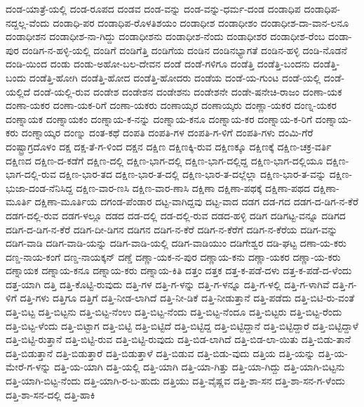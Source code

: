 ದಂಡ-ಯಾತ್ರೆ-ಯಲ್ಲಿ
ದಂಡ-ರೂಪದ
ದಂಡವ
ದಂಡ-ವನ್ನು
ದಂಡ-ವನ್ನು-ಧರ್ಮ-ದಂಡ
ದಂಡಾಧಿಪ
ದಂಡಾಧಿಪ-ನದ್ದಲ್ಲ-ವೆಂದು
ದಂಡಾಧಿ-ಪರ
ದಂಡಾಧಿಪ-ರೊಳತಿಶಯಂ
ದಂಡಾಧೀಶ
ದಂಡಾಧೀಶಂ
ದಂಡಾಧೀಶ-ದಾ-ವಾನ-ಲನೂ
ದಂಡಾಧೀಶನ
ದಂಡಾಧೀಶ-ನಾ-ಗಿದ್ದು
ದಂಡಾಧೀಶನು
ದಂಡಾಧೀಶ-ನೆಂದು
ದಂಡಾಧೀಶರ
ದಂಡಾಧೀಶ-ರೆಂಬ
ದಂಡಾ-ಪುರ
ದಂಡಿಗ-ನ-ಹಳ್ಳಿ-ಯಲ್ಲಿ
ದಂಡಿಗೆ
ದಂಡಿಗೆತ್ತಿ
ದಂಡಿಗೆಯ
ದಂಡಿನ
ದಂಡಿನಭ್ಯಾಗತೆ
ದಂಡಿನ-ಹಳ್ಳಿ
ದಂಡಿ-ನೊಡನೆ
ದಂಡಿ-ಯಿಂದ
ದಂಡು
ದಂಡು-ಅಹೋ-ಬಲ-ದೇವನ
ದಂಡೆ
ದಂಡೆ-ಗಳಿಗೂ
ದಂಡೆತ್ತಿ
ದಂಡೆತ್ತಿ-ಬಂದನು
ದಂಡೆತ್ತಿ-ಬಂದು
ದಂಡೆತ್ತಿ-ಹೋಗಿ
ದಂಡೆತ್ತಿ-ಹೋದ
ದಂಡೆತ್ತಿ-ಹೋದರು
ದಂಡೆಯ
ದಂಡೆ-ಯ-ಗುಂಟ
ದಂಡೆ-ಯಲ್ಲಿ
ದಂಡೆ-ಯಲ್ಲಿದೆ
ದಂಡೆ-ಯಲ್ಲಿ-ರುವ
ದಂಡೇಶ
ದಂಡೇಶನ
ದಂಡೇಶನು
ದಂಡೇಶನೇ
ದಂಡೇ-ಷನೇಚಿ-ರಾಜಂ
ದಂಣಾ-ಯಕ
ದಂಣಾ-ಯಕರ
ದಂಣಾ-ಯಕ-ರಿಗೆ
ದಂಣಾ-ಯಕರು
ದಂಣಾಯ್ಕರ
ದಂಣಾಯ್ಕರು
ದಂಣ್ಣಾ-ಯಕರ
ದಂಣ್ನ-ಯಕರ
ದಂಣ್ನಾಯಕ
ದಂಣ್ನಾಯಕಂ
ದಂಣ್ನಾಯ-ಕ-ನನ್ನು
ದಂಣ್ನಾಯ-ಕನೂ
ದಂಣ್ನಾಯ-ಕರ
ದಂಣ್ನಾಯ-ಕ-ರಿಗೆ
ದಂಣ್ನಾಯ-ಕರು
ದಂಣ್ನಾಯ್ಕರ
ದಂಣ್ನು
ದಂತ-ಕಥೆ
ದಂಪತಿ
ದಂಪತಿ-ಗಳ
ದಂಪತಿ-ಗ-ಳಿಗೆ
ದಂಪತಿ-ಗಳು
ದಂಮಿ-ಗೆರೆ
ದಂಷ್ಟ್ರಾಗ್ರದೊಳಂ
ದಕ್ಷ
ದಕ್ಷ-ತೆ-ಗ-ಳಿಂದ
ದಕ್ಷನ
ದಕ್ಷಿಣ
ದಕ್ಷಿಣಕ್ಕಿ-ರುವ
ದಕ್ಷಿಣಕ್ಕೂ
ದಕ್ಷಿಣಕ್ಕೆ
ದಕ್ಷಿಣ-ಚಕ್ರ-ವರ್ತಿ
ದಕ್ಷಿಣದ
ದಕ್ಷಿಣ-ದ-ಕಡೆಗೆ
ದಕ್ಷಿಣ-ದಲ್ಲಿ
ದಕ್ಷಿಣ-ಭಾಗ-ದಲ್ಲಿ
ದಕ್ಷಿಣ-ಭಾಗ-ದಲ್ಲಿದ್ದ
ದಕ್ಷಿಣ-ಭಾಗ-ದಲ್ಲಿಯೂ
ದಕ್ಷಿಣ-ಭಾಗ-ದಲ್ಲಿ-ರುವ
ದಕ್ಷಿಣ-ಭಾರ-ತದ
ದಕ್ಷಿಣ-ಭಾರ-ತ-ದಲ್ಲಿ
ದಕ್ಷಿಣ-ಭಾರ-ತ-ದಲ್ಲೆಲ್ಲಾ
ದಕ್ಷಿಣ-ಭಾರ-ತ-ವನ್ನು
ದಕ್ಷಿಣ-ಭುಜಾ-ದಂಡ-ನೆನಿಸಿದ್ದ
ದಕ್ಷಿಣ-ವಾರ-ಣಸಿ
ದಕ್ಷಿಣ-ವಾರ-ಣಾಸಿ
ದಕ್ಷಿಣಾ
ದಕ್ಷಿಣಾ-ಪಥಕ್ಕೆ
ದಕ್ಷಿಣಾ-ಪಥದ
ದಕ್ಷಿಣಾ-ಮೂರ್ತಿ
ದಕ್ಷಿಣಾ-ಮೂರ್ತಿಯ
ದಗಂಡ-ಪೆಂಡಾರ
ದಟ್ಟ-ವಾಗಿದ್ದವು
ದಟ್ಟ-ವಾದ
ದಡಗ
ದಡ-ಗದ
ದಡಗ-ದ-ಡಿಗ-ನ-ಕೆರೆ
ದಡಗ-ದಲ್ಲಿ-ರುವ
ದಡಗ-ಳಲ್ಲೂ
ದಡದ
ದಡ-ದಲ್ಲಿ
ದಡ-ದಲ್ಲಿ-ರುವ
ದಡದ-ಹಳ್ಳಿ
ದಡಿಗ
ದಡಿಗಟ್ಟ-ವನ್ನೂ
ದಡಿಗದ
ದಡಿಗ-ದ-ಡಿಗ-ನ-ಕೆರೆ
ದಡಿಗ-ದೀ-ಡಿಗನ
ದಡಿಗನ
ದಡಿಗ-ನ-ಕೆರೆ
ದಡಿಗ-ನ-ಕೆರೆಗೆ
ದಡಿಗ-ನ-ಕೆರೆಯ
ದಡಿಗ-ವನ್ನು
ದಡಿಗ-ವಾಡಿ
ದಡಿಗ-ವಾಡಿ-ಯನ್ನು
ದಡಿಗ-ವಾಡಿ-ಯಲ್ಲಿ
ದಡಿಗ-ವಾಡಿಯುಂ
ದಡಿಗೇಶ್ವರ
ದಡಿ-ಘಟ್ಟ
ದಣಾ-ಯ-ಕರು
ದಣ್ಡ-ನಾಯ-ಕಂಗೆ
ದಣ್ಡ-ನಾಯಕ್ಕನ್
ದಣ್ಡೆ
ದಣ್ಣಾ-ಯಕ-ನ-ಪುರ
ದಣ್ಣಾಯ-ಕನು
ದಣ್ಣಾ-ಯಕರ
ದಣ್ಣಾ-ಯ-ಕರು
ದಣ್ನಾಯಕ
ದಣ್ನಾಯ-ಕನೂ
ದಣ್ನಾಯ-ಕರು
ದಣ್ನಾಯ-ಕಿತಿ
ದತ್ತಂ
ದತ್ತಕ
ದತ್ತ-ಕ-ಪಡೆ-ದಳು
ದತ್ತ-ಕ-ಪಡೆ-ದ-ಳೆಂದು
ದತ್ತ-ಯಾಗಿ
ದತ್ತಿ
ದತ್ತಿ-ಕೊಟ್ಟಿ-ರುವುದು
ದತ್ತಿ-ಗಳ
ದತ್ತಿ-ಗ-ಳನ್ನು
ದತ್ತಿ-ಗ-ಳನ್ನೂ
ದತ್ತಿ-ಗ-ಳಲ್ಲಿ
ದತ್ತಿ-ಗ-ಳಾಗಿವೆ
ದತ್ತಿ-ಗ-ಳಿಗೆ
ದತ್ತಿ-ಗಳು
ದತ್ತಿಗೂ
ದತ್ತಿಗೆ
ದತ್ತಿ-ನೀಡ-ಲಾಗಿದೆ
ದತ್ತಿ-ನೀ-ಡಿಕೆ
ದತ್ತಿ-ನೀಡುತ್ತಾನೆ
ದತ್ತಿ-ಪಡೆದು
ದತ್ತಿ-ಬಿಟಿ-ರು-ವಂತೆ
ದತ್ತಿ-ಬಿಟ್ಟ
ದತ್ತಿ-ಬಿಟ್ಟನು
ದತ್ತಿ-ಬಿಟ್ಟ-ನೆಂಉ
ದತ್ತಿ-ಬಿಟ್ಟ-ನೆಂದು
ದತ್ತಿ-ಬಿಟ್ಟ-ನೆಂದೂ
ದತ್ತಿ-ಬಿಟ್ಟರು
ದತ್ತಿ-ಬಿಟ್ಟ-ರೆಂದು
ದತ್ತಿ-ಬಿಟ್ಟ-ಳೆಂದು
ದತ್ತಿ-ಬಿಟ್ಟಾಗ
ದತ್ತಿ-ಬಿಟ್ಟಿ
ದತ್ತಿ-ಬಿಟ್ಟಿದೆ
ದತ್ತಿ-ಬಿಟ್ಟಿದ್ದ
ದತ್ತಿ-ಬಿಟ್ಟಿದ್ದಾನೆ
ದತ್ತಿ-ಬಿಟ್ಟಿದ್ದಾರೆ
ದತ್ತಿ-ಬಿಟ್ಟಿದ್ದಾಳೆ
ದತ್ತಿ-ಬಿಟ್ಟಿ-ರುತ್ತಾನೆ
ದತ್ತಿ-ಬಿಟ್ಟಿ-ರುವ
ದತ್ತಿ-ಬಿಟ್ಟಿ-ರುವುದು
ದತ್ತಿ-ಬಿಡ-ಲಾಗಿದೆ
ದತ್ತಿ-ಬಿಡ-ಲಾ-ಯಿತು
ದತ್ತಿ-ಬಿಡು-ತಾನೆ
ದತ್ತಿ-ಬಿಡುತ್ತಾನೆ
ದತ್ತಿ-ಬಿಡುತ್ತಾರೆ
ದತ್ತಿ-ಬಿಡುತ್ತಾಳೆ
ದತ್ತಿ-ಬಿಡುವ
ದತ್ತಿ-ಬಿಡು-ವುದು
ದತ್ತಿಯ
ದತ್ತಿ-ಯನ್ನು
ದತ್ತಿ-ಯ-ಮೇರೆ-ಗ-ಳನ್ನು
ದತ್ತಿ-ಯ-ಯಾಗಿ
ದತ್ತಿ-ಯಲ್ಲಿ
ದತ್ತಿ-ಯಾಗಿ
ದತ್ತಿ-ಯಾ-ಗಿತ್ತು
ದತ್ತಿ-ಯಾ-ಗಿದ್ದು
ದತ್ತಿ-ಯಾಗಿ-ಬಿಟ್ಟನು
ದತ್ತಿ-ಯಾಗಿ-ಬಿಟ್ಟ-ನೆಂದು
ದತ್ತಿ-ಯಾಗಿ-ರ-ಬ-ಹುದು
ದತ್ತಿಯು
ದತ್ತಿ-ವೈಷ್ಣವ
ದತ್ತಿ-ಶಾ-ಸನ
ದತ್ತಿ-ಶಾ-ಸನ-ಗ-ಳೆಂದು
ದತ್ತಿ-ಶಾ-ಸನ-ದಲ್ಲಿ
ದತ್ತಿ-ಹಾಕಿ
